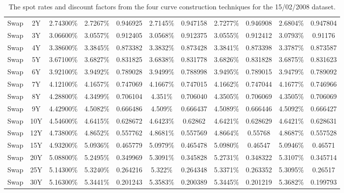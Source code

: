 \begin{landscape}
\begin{table}[ht]
\begin{center}
\begin{tabular}{ccc|cc|cc|cc|cc}
Swap & 2Y & 2.74300\% & 2.7267\% & 0.946925 & 2.7145\% & 0.947158 & 2.7277\% & 0.946908 & 2.6804\% & 0.947804 \\
Swap & 3Y & 3.06600\% & 3.0557\% & 0.912405 & 3.0568\% & 0.912375 & 3.0555\% & 0.912412 & 3.0793\% & 0.91176 \\
Swap & 4Y & 3.38600\% & 3.3845\% & 0.873382 & 3.3832\% & 0.873428 & 3.3841\% & 0.873398 & 3.3787\% & 0.873587 \\
Swap & 5Y & 3.67100\% & 3.6827\% & 0.831825 & 3.6838\% & 0.831778 & 3.6826\% & 0.831828 & 3.6875\% & 0.831623 \\
Swap & 6Y & 3.92100\% & 3.9492\% & 0.789028 & 3.9499\% & 0.788998 & 3.9495\% & 0.789015 & 3.9479\% & 0.789092 \\
Swap & 7Y & 4.12100\% & 4.1657\% & 0.747069 & 4.1667\% & 0.747015 & 4.1662\% & 0.747044 & 4.1677\% & 0.746966 \\
Swap & 8Y & 4.28800\% & 4.3499\% & 0.706104 & 4.351\% & 0.706040 & 4.3505\% & 0.706069 & 4.3505\% & 0.706069 \\
Swap & 9Y & 4.42900\% & 4.5082\% & 0.666486 & 4.509\% & 0.666437 & 4.5089\% & 0.666446 & 4.5092\% & 0.666427 \\
Swap & 10Y & 4.54600\% & 4.6415\% & 0.628672 & 4.6423\% & 0.62862 & 4.6421\% & 0.628629 & 4.6421\% & 0.628631 \\
Swap & 12Y & 4.73800\% & 4.8652\% & 0.557762 & 4.8681\% & 0.557569 & 4.8664\% & 0.55768& 4.8687\% & 0.557528 \\
Swap & 15Y & 4.93200\% & 5.0936\% & 0.465779 & 5.0979\% & 0.465478 & 5.0980\% & 0.46547 & 5.0946\% & 0.46571 \\
Swap & 20Y & 5.08800\% & 5.2495\% & 0.349969 & 5.3091\% & 0.345828 & 5.2731\% & 0.348322 & 5.3107\% & 0.345714 \\
Swap & 25Y & 5.14300\% & 5.3240\% & 0.264216 & 5.322\% & 0.264348 & 5.3371\% & 0.263352 & 5.3095\% & 0.26517 \\
Swap & 30Y & 5.16300\% & 5.3441\% & 0.201243 & 5.3583\% & 0.200389 & 5.3445\% & 0.201219 & 5.3682\% & 0.199793 \\
\toprule

\end{tabular}
\end{center}
\caption[Results|15/02/2008]{The spot rates and discount factors from the four curve construction techniques for the 15/02/2008 dataset.}
\label{tab:results}
\end{table}

\end{landscape}

